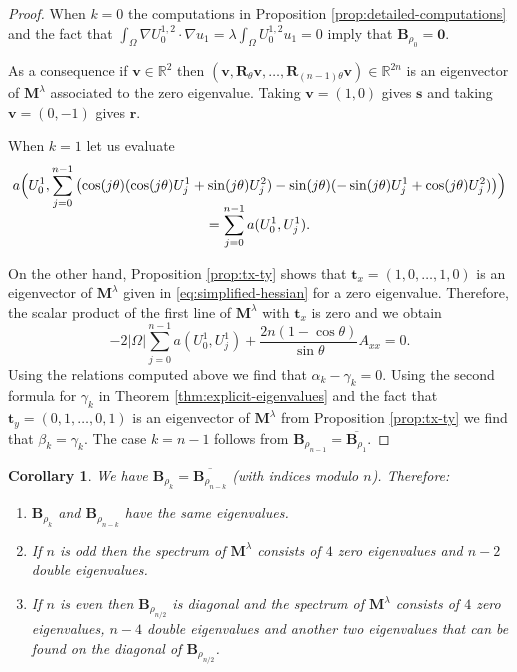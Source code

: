 \documentclass[11pt]{article}
\numberwithin{equation}{section}\newtheorem*{jepEnonce}{\jepEnonceTitle}\newenvironment{enonce*}[1]{\def\jepEnonceTitle{#1}\jepEnonce}{\endjepEnonce}\newtheorem*{conj*}{Conjecture}
\theoremstyle{plain}
\newtheorem{cor}[thm]{Corollary}
\theoremstyle{definition}
\newcommand{\bo}[1]{{\boldsymbol#1}}
\let\Bbb\mathbb
\begin{document}
\begin{proof}
When $k=0$ the computations in Proposition \ref{prop:detailed-computations} and the fact that $\int_\Omega \nabla U_0^{1,2} \cdot \nabla u_1 = \lambda \int_\Omega U_0^{1,2} u_1 = 0$ imply that $\bo B_{\rho_0} = \bo 0$.

As a consequence if $\bo v \in \Bbb{R}^2$ then $(\bo v,\bo R_\theta\bo v,\dots,\bo R_{(n-1)\theta}\bo v) \in \Bbb{R}^{2n}$ is an eigenvector of $\bo M^{\lambda}$ associated to the zero eigenvalue. Taking $\bo v = (1,0)$ gives $\bo s$ and taking $\bo v = (0,-1)$ gives $\bo r$.

When $k=1$ let us evaluate
\vspace*{-5pt}
\begin{multline*}
a\Bigl(U_0^1,\sum_{j=0}^{n-1} \left(\cos(j\theta)(\cos(j\theta) U_j^1+\sin(j\theta)U_j^2) - \sin(j\theta)(-\sin (j\theta)U_j^1+\cos(j\theta)U_j^2)\right) \Bigr)\\[-8pt]
=\sum_{j=0}^{n-1} a(U_0^1,U_j^1).
\end{multline*}

On the other hand, Proposition \ref{prop:tx-ty} shows that $\bo t_x=(1,0,\dots,1,0)$ is an eigenvector of $\bo M^\lambda$ given in \ref{eq:simplified-hessian} for a zero eigenvalue. Therefore, the scalar product of the first line of $\bo M^\lambda$ with $\bo t_x$ is zero and we obtain
\[
-2|\Omega| \sum_{j=0}^{n-1} a(U_0^1,U_j^1) +\frac{2n(1-\cos \theta)}{\sin \theta} A_{xx} = 0.
\]
Using the relations computed above we find that $\alpha_k-\gamma_k=0$.
Using the second formula for $\gamma_k$ in Theorem \ref{thm:explicit-eigenvalues} and the fact that $\bo t_y= (0,1,\dots,0,1)$ is an eigenvector of $\bo M^\lambda$ from Proposition \ref{prop:tx-ty} we find that $\beta_k = \gamma_k$. The case $k=n-1$ follows from $\bo B_{\rho_{n-1}} = \overline{\bo B_{\rho_1}}$.
\end{proof}

\begin{cor}
We have $\bo B_{\rho_k} = \overline{\bo B_{\rho_{n-k}}}$ (with indices modulo $n$). Therefore:
\begin{enumerate}
\item
$\bo B_{\rho_k}$ and $\bo B_{\rho_{n-k}}$ have the same eigenvalues.

\item
If $n$ is odd then the spectrum of $\bo M^\lambda$ consists of $4$ zero eigenvalues and $n-2$ double eigenvalues.

\item
If $n$ is even then $\bo B_{\rho_{n/2}}$ is diagonal and the spectrum of $\bo M^\lambda$ consists of $4$ zero eigenvalues, $n-4$ double eigenvalues and another two eigenvalues that can be found on the diagonal of $\bo B_{\rho_{n/2}}$.
\end{enumerate}
\end{cor}
\end{document}

